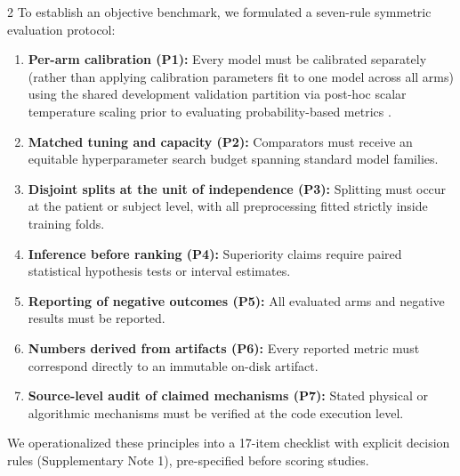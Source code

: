 \documentclass[10pt,a4paper,twoside]{article}
\begin{document}
\begin{multicols}{2}
To establish an objective benchmark, we formulated a seven-rule symmetric evaluation protocol:
\begin{enumerate}
  \setlength{\itemsep}{1pt}
  \setlength{\parskip}{0pt}
  \item \textbf{Per-arm calibration (P1):} Every model must be calibrated separately (rather than applying calibration parameters fit to one model across all arms) using the shared development validation partition via post-hoc scalar temperature scaling prior to evaluating probability-based metrics \cite{guo2017}.
  \item \textbf{Matched tuning and capacity (P2):} Comparators must receive an equitable hyperparameter search budget spanning standard model families.
  \item \textbf{Disjoint splits at the unit of independence (P3):} Splitting must occur at the patient or subject level, with all preprocessing fitted strictly inside training folds.
  \item \textbf{Inference before ranking (P4):} Superiority claims require paired statistical hypothesis tests or interval estimates.
  \item \textbf{Reporting of negative outcomes (P5):} All evaluated arms and negative results must be reported.
  \item \textbf{Numbers derived from artifacts (P6):} Every reported metric must correspond directly to an immutable on-disk artifact.
  \item \textbf{Source-level audit of claimed mechanisms (P7):} Stated physical or algorithmic mechanisms must be verified at the code execution level.
\end{enumerate}

We operationalized these principles into a 17-item checklist with explicit decision rules (Supplementary Note 1), pre-specified before scoring studies.


\end{multicols}
\end{document}
